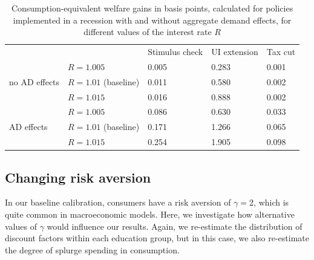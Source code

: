 \documentclass[\econtexRoot/EGMN]{subfiles}
\begin{document}
\begin{table}[]
    \begin{center}
        \begin{tabular}{@{}lllll@{}}
            \toprule
                                           &                       & Stimulus check & UI extension & Tax cut \\ \cmidrule(l){1-5}
            \multirow{3}{*}{no AD effects} & $R = 1.005$           & 0.005          & 0.283        & 0.001   \\
                                           & $R = 1.01$ (baseline) & 0.011          & 0.580        & 0.002   \\
                                           & $R = 1.015$           & 0.016          & 0.888        & 0.002   \\ \cmidrule(l){1-5}
            \multirow{3}{*}{AD effects}    & $R = 1.005$           & 0.086          & 0.630        & 0.033   \\
                                           & $R = 1.01$ (baseline) & 0.171          & 1.266        & 0.065   \\
                                           & $R = 1.015$           & 0.254          & 1.905        & 0.098   \\ \cmidrule(l){1-5}
        \end{tabular}
        \caption{Consumption-equivalent welfare gains in basis points, calculated for policies implemented in a recession with and without aggregate demand effects, for different values of the interest rate $R$}
        \notinsubfile{\label{tab:robustness_R_results}}
    \end{center}
\end{table}


\FloatBarrier
\hypertarget{changing-risk-aversion}{}\par\subsection{Changing risk aversion}
\notinsubfile{\label{sec:robust_gamma}}

In our baseline calibration, consumers have a risk aversion of $\gamma=2$, which is quite common in macroeconomic models. Here, we investigate how alternative values of $\gamma$ would influence our results. Again, we re-estimate the distribution of discount factors within each education group, but in this case, we also re-estimate the degree of splurge spending in consumption.
\end{document}
